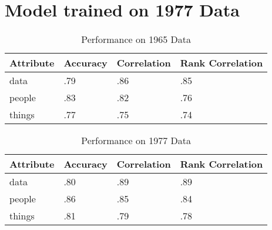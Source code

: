\documentclass[11pt]{article}
\begin{document}
\section{Model trained on 1977 Data}

  \begin{table}[h!]
    \centering
    \caption{Performance on 1965 Data}
    \begin{tabular}{|l|l|l|l|}
    \hline
    \textbf{Attribute} & \textbf{Accuracy} & \textbf{Correlation} & \textbf{Rank Correlation} \\ \hline
    data               & .79              & .86                  & .85                       \\ \hline
    people             & .83              & .82                  & .76                       \\ \hline
    things             & .77              & .75                  & .74                       \\ \hline
    \end{tabular}
  \end{table}

  \begin{table}[h!]
    \centering
    \caption{Performance on 1977 Data}
  \begin{tabular}{|l|l|l|l|}
  \hline
  \textbf{Attribute} & \textbf{Accuracy} & \textbf{Correlation} & \textbf{Rank Correlation} \\ \hline
  data               & .80              & .89                  & .89                       \\ \hline
  people             & .86              & .85                  & .84                       \\ \hline
  things             & .81              & .79                  & .78                       \\ \hline
  \end{tabular}
  \end{table}
\end{document}
